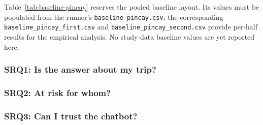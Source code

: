 Table~\ref{tab:baseline-pincay} reserves the pooled baseline layout. Its values must be
populated from the runner's \texttt{baseline\_pincay.csv}; the corresponding
\texttt{baseline\_pincay\_first.csv} and \texttt{baseline\_pincay\_second.csv} provide
per-half results for the empirical analysis. No study-data baseline values are yet
reported here.

\subsubsection{SRQ1: Is the answer about my trip?}

\subsubsection{SRQ2: At risk for whom?}

\subsubsection{SRQ3: Can I trust the chatbot?}
